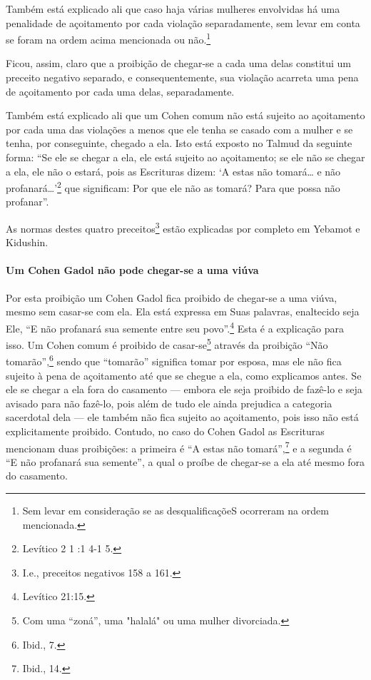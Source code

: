 Também está explicado ali que caso haja várias mulheres envolvidas há
uma penalidade de açoitamento por cada violação separadamente, sem
levar em conta se foram na ordem acima mencionada ou
não.\footnote{Sem levar em consideração se as desqualificaçõeS ocorreram na ordem
mencionada.}

Ficou, assim, claro que a proibição de chegar-se a cada uma delas
constitui um preceito negativo separado, e consequentemente, sua
violação acarreta uma pena de açoitamento por cada uma delas,
separadamente.

Também está explicado ali que um Cohen comum não está sujeito ao
açoitamento por cada uma das violações a menos que ele tenha se casado
com a mulher e se tenha, por conseguinte, chegado a ela. Isto está
exposto no Talmud da seguinte forma: ``Se ele se chegar a ela, ele está
sujeito ao açoitamento; se ele não se chegar a ela, ele não o estará,
pois as Escrituras dizem: `A estas não tomará\ldots{} e não profanará\ldots{}'\footnote{Levítico 2 1 :1 4-1 5.} que significam: Por que ele não as tomará? Para
que possa não profanar''.

As normas destes quatro preceitos\footnote{I.e., preceitos negativos 158 a 161.} estão explicadas
por completo em Yebamot e Kidushin.

\paragraph{Um Cohen Gadol não pode chegar-se a uma viúva}

Por esta proibição um Cohen Gadol fica proibido de chegar-se a uma
viúva, mesmo sem casar-se com ela. Ela está expressa em Suas palavras,
enaltecido seja Ele, ``E não profanará sua semente entre seu povo''.\footnote{Levítico 21:15.} Esta é a explicação para isso. Um Cohen comum é
proibido de casar-se\footnote{Com uma ``zoná'', uma "halalá" ou uma mulher divorciada.} através da proibição ``Não
tomarão'',\footnote{Ibid., 7.} sendo que ``tomarão'' significa tomar por esposa,
mas ele não fica sujeito à pena de açoitamento até que se chegue a ela,
como explicamos antes. Se ele se chegar a ela fora do casamento ---
embora ele seja proibido de fazê-lo e seja avisado para não fazê-lo,
pois além de tudo ele ainda prejudica a categoria sacerdotal dela ---
ele também não fica sujeito ao açoitamento, pois isso não está
explicitamente proibido. Contudo, no caso do Cohen Gadol as
Escrituras mencionam duas proibições: a primeira é ``A estas não
tomará'',\footnote{Ibid., 14.} e a segunda é ``E não profanará sua semente'', a
qual o proíbe de chegar-se a ela até mesmo fora do casamento.

